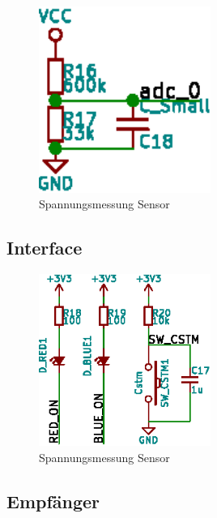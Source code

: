 \begin{figure}[h!t]
    \includegraphics[width=0.5\textwidth]{images/sensor-sch/sensor--sch--sensor.eps}
    \caption{Spannungsmessung Sensor}
\end{figure}


\subsection{Interface}
\label{subsec:hw:sensor:interface}

\begin{figure}[h!t]
    \includegraphics[width=0.5\textwidth]{images/sensor-sch/sensor--sch--interface.eps}
    \caption{Spannungsmessung Sensor}
\end{figure}


\subsection{Empf\"anger}
\label{subsec:hw:sensor:receiver}

